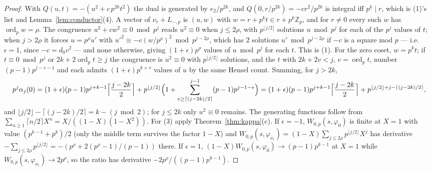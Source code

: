 \documentclass[11pt,reqno]{amsart}
\theoremstyle{plain}
\theoremstyle{definition}
\DeclareMathOperator{\ord}{ord}
\newcommand{\Z}{\mathbb{Z}}
\begin{document}
\begin{proof}
With $Q(u,t)=-(u^2+c\,p^{2k}t^2)$ the dual is generated by $e_2/p^{2k}$, and $Q(0,r/p^{2k})=
-cr^2/p^{2k}$ is integral iff $p^k\mid r$, which is (1)'s list and Lemma~\ref{lem:conductor}(4).
A vector of $\nu_r+L_{-,p}$ is $(u,w)$ with $w=r+p^kt\in r+p^k\Z_p$, and for $r\ne0$ every such $w$
has $\ord_pw=\rho$. The congruence $u^2+cw^2\equiv0\bmod p^j$ reads $u^2\equiv0$ when $j\le2\rho$,
with $p^{\lfloor j/2\rfloor}$ solutions $u\bmod p^j$ for each of the $p^j$ values of $t$; when
$j>2\rho$ it forces $u=p^\rho u'$ with $u'^2\equiv-c(w/p^\rho)^2\bmod p^{j-2\rho}$, which has $2$
solutions $u'\bmod p^{j-2\rho}$ if $-c$ is a square mod $p$ --- i.e.\ $\epsilon=1$, since
$-c=d_0v^2$ --- and none otherwise, giving $(1+\epsilon)p^{\rho}$ values of $u\bmod p^j$ for each
$t$. This is (1). For the zero coset, $w=p^kt$; if $t\equiv0\bmod p^j$ or $2k+2\ord_pt\ge j$ the
congruence is $u^2\equiv0$ with $p^{\lfloor j/2\rfloor}$ solutions, and the $t$ with
$2k+2v<j$, $v=\ord_pt$, number $(p-1)p^{j-v-1}$ and each admits $(1+\epsilon)p^{k+v}$ values of
$u$ by the same Hensel count. Summing, for $j>2k$,
\[
  p^j\alpha_j(0)=(1+\epsilon)(p-1)p^{j+k-1}\Bigl\lceil\frac{j-2k}2\Bigr\rceil
   +p^{\lfloor j/2\rfloor}\Bigl(1+\sum_{v\ge\lceil(j-2k)/2\rceil}^{j-1}(p-1)p^{j-1-v}\Bigr)
   =(1+\epsilon)(p-1)p^{j+k-1}\Bigl\lceil\frac{j-2k}2\Bigr\rceil+p^{\lfloor j/2\rfloor+j-\lceil(j-2k)/2\rceil},
\]
and $\lfloor j/2\rfloor-\lceil (j-2k)/2\rceil=k-(j\bmod2)$; for $j\le2k$ only $u^2\equiv0$ remains.
The generating functions follow from $\sum_{n\ge1}\lceil n/2\rceil X^n=X/((1-X)(1-X^2))$. For (3)
apply Theorem~\ref{thm:kappa}(c). If $\epsilon=-1$, $W_{0,p}(s,\varphi_0)$ is finite at $X=1$ with
value $(p^{k-1}+p^k)/2$ (only the middle term survives the factor $1-X$) and $W_{0,p}(s,
\varphi_{\nu_r})=(1-X)\sum_{j\le2\rho}p^{\lfloor j/2\rfloor}X^j$ has derivative
$-\sum_{j\le2\rho}p^{\lfloor j/2\rfloor}=-(p^\rho+2(p^\rho-1)/(p-1))$ there. If $\epsilon=1$,
$(1-X)W_{0,p}(s,\varphi_0)\to(p-1)p^{k-1}$ at $X=1$ while $W_{0,p}(s,\varphi_{\nu_r})\to2p^\rho$,
so the ratio has derivative $-2p^\rho/((p-1)p^{k-1})$.


\end{proof}
\end{document}
